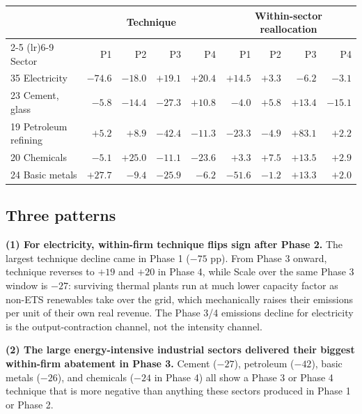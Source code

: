 \documentclass[11pt]{article}
\begin{document}
\begin{center}
\small
\begin{tabular}{lrrrrrrrr}
\toprule
 & \multicolumn{4}{c}{Technique} & \multicolumn{4}{c}{Within-sector reallocation} \\
\cmidrule(lr){2-5} \cmidrule(lr){6-9}
Sector & P1 & P2 & P3 & P4 & P1 & P2 & P3 & P4 \\
\midrule
35 Electricity            & $\mathbf{-74.6}$ & $-18.0$ & $\mathbf{+19.1}$ & $\mathbf{+20.4}$ & $+14.5$ & $+3.3$  & $-6.2$           & $-3.1$ \\
23 Cement, glass          & $-5.8$           & $-14.4$ & $\mathbf{-27.3}$ & $+10.8$           & $-4.0$  & $+5.8$  & $+13.4$          & $\mathbf{-15.1}$ \\
19 Petroleum refining     & $+5.2$           & $+8.9$  & $\mathbf{-42.4}$ & $-11.3$           & $-23.3$ & $-4.9$  & $\mathbf{+83.1}$ & $+2.2$ \\
20 Chemicals              & $-5.1$           & $+25.0$ & $-11.1$          & $\mathbf{-23.6}$  & $+3.3$  & $+7.5$  & $+13.5$          & $+2.9$ \\
24 Basic metals           & $+27.7$          & $-9.4$  & $\mathbf{-25.9}$ & $-6.2$            & $-51.6$ & $-1.2$  & $+13.3$          & $+2.0$ \\
\bottomrule
\end{tabular}
\end{center}

\subsection{Three patterns}

\textbf{(1) For electricity, within-firm technique flips sign after Phase 2.} The largest technique decline came in Phase 1 ($-75$ pp). From Phase 3 onward, technique reverses to $+19$ and $+20$ in Phase 4, while Scale over the same Phase 3 window is $-27$: surviving thermal plants run at much lower capacity factor as non-ETS renewables take over the grid, which mechanically raises their emissions per unit of their own real revenue. The Phase 3/4 emissions decline for electricity is the output-contraction channel, not the intensity channel.

\textbf{(2) The large energy-intensive industrial sectors delivered their biggest within-firm abatement in Phase 3.} Cement ($-27$), petroleum ($-42$), basic metals ($-26$), and chemicals ($-24$ in Phase 4) all show a Phase 3 or Phase 4 technique that is more negative than anything these sectors produced in Phase 1 or Phase 2.
\end{document}
